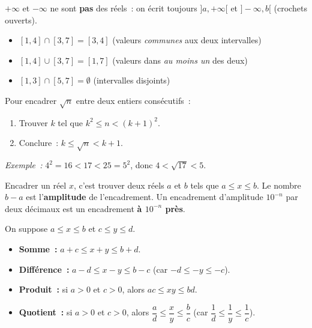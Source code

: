 \begin{remarque}
$+\infty$ et $-\infty$ ne sont \textbf{pas} des r\'eels~: on \'ecrit toujours
$]a,+\infty[$ et $]-\infty,b[$ (crochets ouverts).
\end{remarque}

\begin{prop}
\begin{itemize}
  \item $[1,4] \cap [3,7] = [3,4]$ (valeurs \emph{communes} aux deux intervalles)
  \item $[1,4] \cup [3,7] = [1,7]$ (valeurs dans \emph{au moins un} des deux)
  \item $[1,3] \cap [5,7] = \emptyset$ (intervalles disjoints)
\end{itemize}
\end{prop}

\begin{methode}
Pour encadrer $\sqrt{n}$ entre deux entiers cons\'ecutifs~:
\begin{enumerate}
  \item Trouver $k$ tel que $k^2 \leq n < (k+1)^2$.
  \item Conclure~: $k \leq \sqrt{n} < k+1$.
\end{enumerate}
\emph{Exemple~:} $4^2=16 < 17 < 25=5^2$, donc $4 < \sqrt{17} < 5$.
\end{methode}

\begin{defn}[Encadrement]
Encadrer un r\'eel $x$, c'est trouver deux r\'eels $a$ et $b$ tels que
$a\leq x\leq b$. Le nombre $b-a$ est l'\textbf{amplitude} de l'encadrement.
Un encadrement d'amplitude $10^{-n}$ par deux d\'ecimaux est un
encadrement \textbf{\`a $10^{-n}$ pr\`es}.
\end{defn}

\begin{prop}
On suppose $a\leq x\leq b$ et $c\leq y\leq d$.
\begin{itemize}
  \item \textbf{Somme~:} $a+c\leq x+y\leq b+d$.
  \item \textbf{Diff\'erence~:} $a-d\leq x-y\leq b-c$
        (car $-d\leq -y\leq -c$).
  \item \textbf{Produit~:} si $a>0$ et $c>0$, alors $ac\leq xy\leq bd$.
  \item \textbf{Quotient~:} si $a>0$ et $c>0$, alors
        $\dfrac{a}{d}\leq\dfrac{x}{y}\leq\dfrac{b}{c}$
        (car $\dfrac1d\leq\dfrac1y\leq\dfrac1c$).
\end{itemize}
\end{prop}

